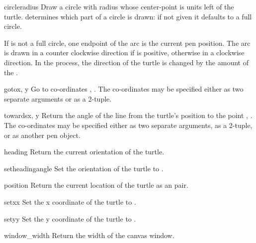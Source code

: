 \begin{funcdesc}{circle}{radius}
Draw a circle with radius  whose center-point is
 units left of the turtle.
 determines which part of a circle is drawn: if
not given it defaults to a full circle.

If  is not a full circle, one endpoint of the arc is the
current pen position. The arc is drawn in a counter clockwise
direction if  is positive, otherwise in a clockwise
direction.  In the process, the direction of the turtle is changed
by the amount of the .
\end{funcdesc}

\begin{funcdesc}{goto}{x, y}
Go to co-ordinates , .  The co-ordinates may be
specified either as two separate arguments or as a 2-tuple.
\end{funcdesc}

\begin{funcdesc}{towards}{x, y}
Return the angle of the line from the turtle's position
to the point , . The co-ordinates may be
specified either as two separate arguments, as a 2-tuple,
or as another pen object.
\end{funcdesc}

\begin{funcdesc}{heading}{}
Return the current orientation of the turtle.
\end{funcdesc}

\begin{funcdesc}{setheading}{angle}
Set the orientation of the turtle to .
\end{funcdesc}

\begin{funcdesc}{position}{}
Return the current location of the turtle as an  pair.
\end{funcdesc}

\begin{funcdesc}{setx}{x}
Set the x coordinate of the turtle to .
\end{funcdesc}

\begin{funcdesc}{sety}{y}
Set the y coordinate of the turtle to .
\end{funcdesc}

\begin{funcdesc}{window\_width}{}
Return the width of the canvas window.
\end{funcdesc}

